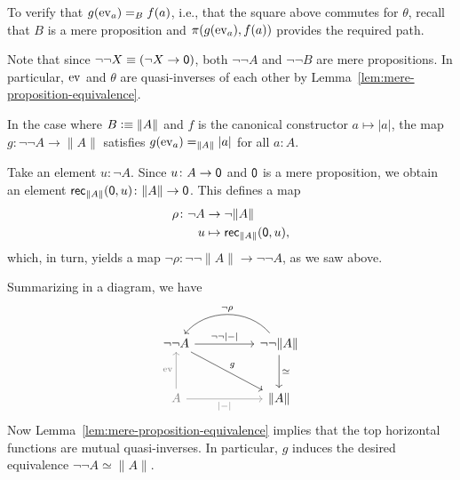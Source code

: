 \begin{solution}
    To verify that $g({\operatorname{ev}}_{a})\mathrel{=_{B}}f(a)$, i.e., that the square above commutes for $\theta$, recall that $B$ is a mere proposition and $\pi(g({\operatorname{ev}}_{a}),f(a))$ provides the required path.

    Note that since $\neg\neg X\equiv(\neg X\to\mathsf{0})$, both $\neg\neg A$ and $\neg\neg B$ are mere propositions. In particular, ${\operatorname{ev}}_{}$ and $\theta$ are quasi-inverses of each other by Lemma~\ref{lem:mere-proposition-equivalence}.

    In the case where $B\mathrel{\vcentcolon}\equiv\lVert A\rVert$ and $f$ is the canonical constructor $a\mapsto\lvert a\rvert$, the map $g\colon\neg\neg A\to\lVert A\rVert$ satisfies $g({\operatorname{ev}}_{a})\mathrel{=_{\lVert A\rVert}}\lvert a\rvert$ for all $a\colon A$.

    Take an element $u\colon\neg A$. Since $u\colon A\to\fun0$ and $\mathsf{0}$ is a mere proposition, we obtain an element $\fun{rec}_{\lVert A\rVert}(\fun0,u)\colon\lVert A\rVert\to\fun0$. This defines a map
    \begin{align*}
        \rho\colon\neg A&\to\neg\lVert A\rVert\\
        u&\mapsto\fun{rec}_{\lVert A\rVert}(\fun0,u),
    \end{align*}
    which, in turn, yields a map $\neg\rho\colon\neg\neg\lVert A\rVert\to\neg\neg A$, as we saw above.

    Summarizing in a diagram, we have
    \[
        \begin{tikzcd}[row sep=large,column sep=huge]
            \neg\neg A
                    \arrow[rd,"g"]
                    \arrow[r,"\neg\neg\lvert-\rvert"]
                &\neg\neg\lVert A\rVert
                    \arrow[d,"\simeq",]
                    \arrow[l,"\neg\rho"',bend right=50]\\
            |[text=gray]|A
                    \arrow[r,"\lvert-\rvert"',gray]
                    \arrow[u,"\ev{}",gray]
                &\lVert A\rVert
        \end{tikzcd}
    \]
    Now Lemma~\ref{lem:mere-proposition-equivalence} implies that the top horizontal functions are mutual quasi-inverses. In particular, $g$ induces the desired equivalence $\neg\neg A\simeq\lVert A\rVert$.

\end{solution}

